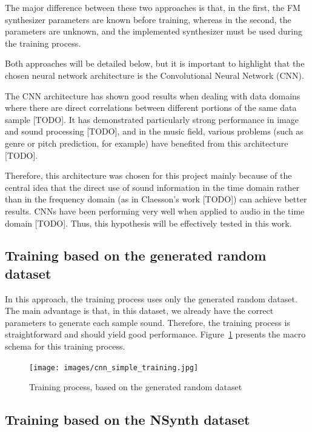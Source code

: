 \documentclass[sigconf,natbib=false]{acmart}
\begin{document}
The major difference between these two approaches is that, in the first, the FM synthesizer parameters are known before training, whereas in the second, the parameters are unknown, and the implemented synthesizer must be used during the training process.

Both approaches will be detailed below, but it is important to highlight that the chosen neural network architecture is the Convolutional Neural Network (CNN).

The CNN architecture has shown good results when dealing with data domains where there are direct correlations between different portions of the same data sample [TODO]. It has demonstrated particularly strong performance in image and sound processing [TODO], and in the music field, various problems (such as genre or pitch prediction, for example) have benefited from this architecture [TODO].

Therefore, this architecture was chosen for this project mainly because of the central idea that the direct use of sound information in the time domain rather than in the frequency domain (as in Claesson’s work [TODO]) can achieve better results. CNNs have been performing very well when applied to audio in the time domain [TODO]. Thus, this hypothesis will be effectively tested in this work.

\subsection{Training based on the generated random dataset}


In this approach, the training process uses only the generated random dataset. The main advantage is that, in this dataset, we already have the correct parameters to generate each sample sound. Therefore, the training process is straightforward and should yield good performance. Figure~\ref{fig:cnn_simple_training} presents the macro schema for this training process.

\begin{figure}[htb]
 \caption{Training process, based on the generated random dataset}
 \label{fig:cnn_simple_training}
 \centering
 \texttt{[image: images/cnn\_simple\_training.jpg]}
\end{figure}

\subsection{Training based on the NSynth dataset}
\end{document}
